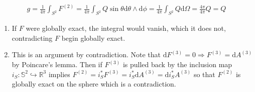 \documentclass[12pt,a4]{article}
\newcommand{\e}{\mathrm{d}}
\begin{document}
\begin{enumerate}
\begin{enumerate}
        \begin{align*}
          g =
          \frac{1}{4 \pi}\int_{S^2} F^{(2)} =
          \frac{1}{4 \pi}\int_{S^2} Q \sin \theta \e \theta \wedge \e \phi =
          \frac{1}{4 \pi}\int_{S^2} Q \e \Omega =
          \frac{4 \pi}{4 \pi} Q  = Q
        \end{align*}
        \begin{enumerate}
          \item
            If $F$ were globally exact, the integral would vanish, which it does not, contradicting $F$ begin globally exact.
          \item
            This is an argument by contradiction.
            Note that $\e F^{(3)} = 0 \Rightarrow F^{(3)} = \e A^{(3)}$ by Poincare's lemma. 
            Then if $F^{(3)}$ is pulled back by the inclusion map $i_S : \mathbb{S}^2 \hookrightarrow \mathbb{R}^{3}$ implies $F^{(2)} = i_S^*F^{(3)} = i_S^*\e A^{(3)} = \e i_S^*A^{(3)}$ so that $F^{(2)}$ is globally exact on the sphere which is a contradiction.



\end{enumerate}
\end{enumerate}
\end{enumerate}
\end{document}

